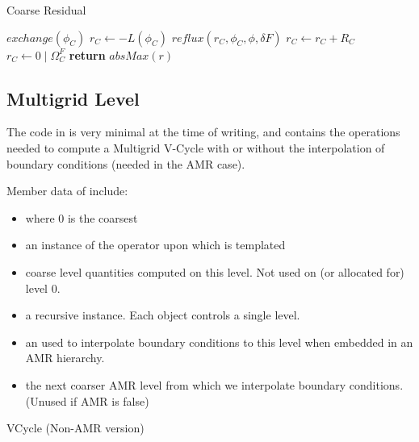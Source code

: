 \documentclass[12pt,a4paper]{article}
\begin{document}
\begin{algorithm}
\caption{Coarse Residual}
\begin{algorithmic}[1]
\State $exchange(\phi_C)$
\State $r_C \gets -L(\phi_C)$
\State $reflux(r_C, \phi_C, \phi, \delta F)$
\State $r_C \gets r_C + R_C$
\State $r_C \gets 0 \mid \Omega_C^F$
\State \textbf{return} $absMax(r)$
\EndProcedure
\end{algorithmic}
\end{algorithm}


\pagebreak
\subsection{Multigrid Level}

The code in  is very minimal at the time of writing, and contains the operations needed to compute a Multigrid V-Cycle with or without the interpolation of boundary conditions (needed in the AMR case). 

Member data of  include:
\begin{itemize}
\item {} where 0 is the coarsest 
\item {} an instance of the operator upon which  is templated
\item {} coarse level quantities computed on this level. Not used on (or allocated for) level 0. 
\item {} a recursive  instance. Each  object controls a single level.
\item {} an  used to interpolate boundary conditions to this level when embedded in an AMR hierarchy. 
\item {} the next coarser AMR level from which we interpolate boundary conditions. (Unused if AMR is false)
\end{itemize}

\begin{algorithm}
\caption{VCycle (Non-AMR version)}
\begin{algorithmic}[1]
\Else
\EndIf
\EndProcedure
\end{algorithmic}
\end{algorithm}
\end{document}
